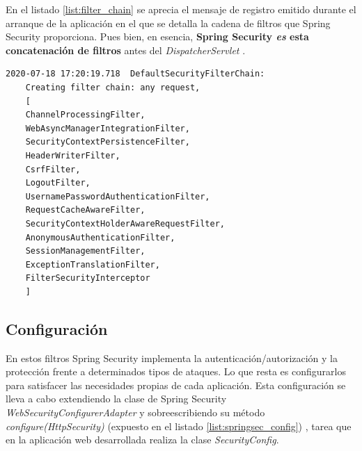 \documentclass[a4paper,12pt,twoside,openright]{report}
\begin{document}
	En el listado \ref{list:filter_chain} se aprecia el mensaje de registro emitido durante el arranque de la aplicación en el que se detalla la cadena de filtros que Spring Security proporciona. Pues bien, en esencia, \textbf{Spring Security \emph{es} esta concatenación de filtros} antes del \emph{DispatcherServlet} \cite{Behler2020}.
	\\
	
	\begin{lstlisting}[caption=Cadena de filtros creada por Spring Security, label=list:filter_chain]
	2020-07-18 17:20:19.718  DefaultSecurityFilterChain: 
	Creating filter chain: any request, 
	[
	ChannelProcessingFilter, 
	WebAsyncManagerIntegrationFilter, 
	SecurityContextPersistenceFilter, 
	HeaderWriterFilter, 
	CsrfFilter, 
	LogoutFilter, 
	UsernamePasswordAuthenticationFilter, 
	RequestCacheAwareFilter, 
	SecurityContextHolderAwareRequestFilter, 
	AnonymousAuthenticationFilter, 
	SessionManagementFilter, 
	ExceptionTranslationFilter, 
	FilterSecurityInterceptor
	]
	\end{lstlisting}
	
	\subsection{Configuración}
	En estos filtros Spring Security implementa la autenticación/autorización y la protección frente a determinados tipos de ataques. Lo que resta es configurarlos para satisfacer las necesidades propias de cada aplicación. Esta configuración se lleva a cabo extendiendo la clase de Spring Security \emph{WebSecurityConfigurerAdapter} y sobreescribiendo su método \emph{configure(HttpSecurity)} (expuesto en el listado \ref{list:springsec_config}) \cite{Behler2020} \cite{Alex2020}, tarea que en la aplicación web desarrollada realiza la clase \emph{SecurityConfig}.
	\\
	
\end{document}
